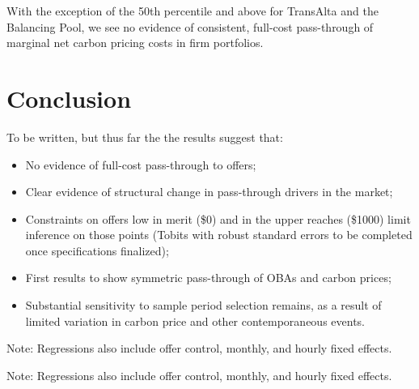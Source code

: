 \documentclass[12pt]{article}
\begin{document}
With the exception of the 50th percentile and above for TransAlta and the Balancing Pool, we see no evidence of consistent, full-cost pass-through of marginal net carbon pricing costs in firm portfolios. 




\section{Conclusion}\label{sec:conclusion}


To be written, but thus far the the results suggest that:
\begin{itemize}
  \item No evidence of full-cost pass-through to offers;
  \item Clear evidence of structural change in pass-through drivers in the market;
  \item Constraints on offers low in merit (\$0) and in the upper reaches (\$1000) limit inference on those points (Tobits with robust standard errors to be completed once specifications finalized);
  \item First results to show symmetric pass-through of OBAs and carbon prices;
  \item Substantial sensitivity to sample period selection remains, as a result of limited variation in carbon price and other contemporaneous events.
  \end{itemize}
  
\newpage
  
{\setlength{\baselineskip}{16pt}

}


\appendix
\renewcommand{\thetable}{A\arabic{table}}
\setcounter{table}{0}

\begin{landscape}

\noindent Note: Regressions also include offer control, monthly, and hourly fixed effects.
\end{landscape}

\begin{landscape}

\noindent Note: Regressions also include offer control, monthly, and hourly fixed effects.
\end{landscape}
\end{document}
